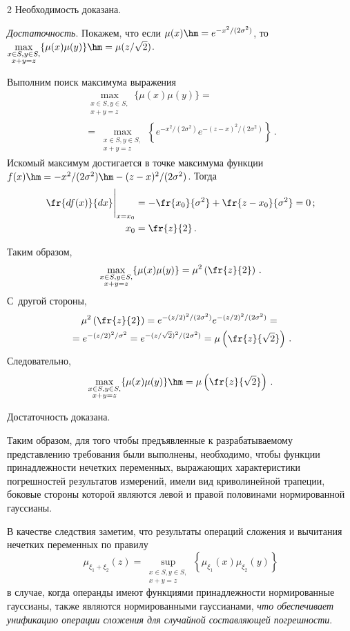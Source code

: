 \begin{multicols}{2}
  Необходимость доказана.
  \smallskip
  
  \textit{Достаточность}. Покажем, что если $\mu(x)\hm= e^{- 
x^2/(2\sigma^2)}$, то $\max\limits_{\substack{{x\in S, y\in S,}\\{x+y=z}}}\{\mu(x) 
\mu(y)\} \hm= \mu(z/\sqrt{2})$.
  
  Выполним поиск максимума выражения 
  \begin{multline*}
  \max\limits_{\substack{{x\in S, y\in S,}\\{x+y=z}}}\{\mu(x)\mu(y)\}={}\\
  {}= \max\limits_{\substack{{x\in S, y\in S,}\\{x+y=z}}}
  \left\{ e^{-x^2/(2\sigma^2)} e^{-(z-x)^2/(2\sigma^2)}\right\}\,. 
  \end{multline*}
Искомый максимум достигается в точке максимума функции $f(x)\hm=-
x^2/(2\sigma^2)\hm- (z-x)^2/(2\sigma^2)$. Тогда 
  \begin{align*}
  \fr{df(x)}{dx}\Bigg\vert_{x=x_0}&=-\fr{x_0}{\sigma^2}+\fr{z-x_0}{\sigma^2}=0\,;\\
  x_0&=\fr{z}{2}\,.
  \end{align*}
  
  Таким образом, 
  $$
  \max\limits_{\substack{{x\in S, y\in  S,}\\{x+y=z}}}\{\mu(x)\mu(y)\}= \mu^2\left(\fr{z}{2}\right)\,.
  $$
  С~другой стороны, 
  \begin{multline*}
  \mu^2\left(\fr{z}{2}\right)= e^{-(z/2)^2/(2\sigma^2)} e^{-(z/2)^2/(2\sigma^2)}={}\\
  {}= e^{-(z/2)^2/\sigma^2}=e^{-(z/\sqrt{2})^2/(2\sigma^2)}=\mu\left(\fr{z}{\sqrt{2}}\right)\,.
  \end{multline*} 
Следовательно, 
$$
\max\limits_{\substack{{x\in S, y\in 
S,}\\{x+y=z}}}\{\mu(x)\mu(y)\}\hm= \mu\left(\fr{z}{\sqrt{2}}\right)\,.
$$ 

Достаточность доказана. 
  
  \smallskip
  
  Таким образом, для того чтобы предъявленные к разрабатываемому 
представлению требования были выполнены, необходимо, чтобы функции 
принадлежности нечетких переменных, выражающих характеристики 
погрешностей результатов измерений, имели вид криволинейной трапеции, 
боковые стороны которой являются левой и правой половинами 
нормированной гауссианы.
  
  В качестве следствия заметим, что результаты операций сложения и 
вычитания нечетких переменных по правилу 
$$
\mu_{\xi_1+\xi_2}(z)= 
\sup\limits_{\substack{{x\in S, y\in S,}\\{x+y=z}}}
\left\{\mu_{\xi_1}(x)\mu_{\xi_2}(y)\right\}
$$ 
в случае, когда операнды имеют функциями 
принадлежности нормированные гауссианы, также являются нормированными 
гауссианами, \textit{что обеспечивает унификацию операции сложения для 
случайной составляющей погрешности}.
  

\end{multicols}
